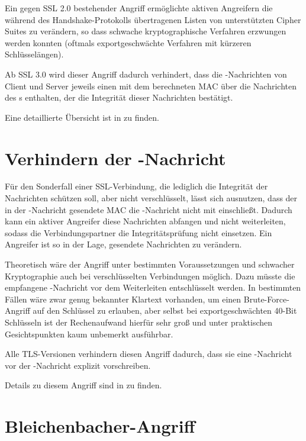 Ein gegen SSL 2.0 bestehender Angriff ermöglichte aktiven Angreifern die während des Handshake-Protokolls übertragenen Listen von unterstützten Cipher Suites zu verändern, so dass schwache kryptographische Verfahren erzwungen werden konnten (oftmals exportgeschwächte Verfahren mit kürzeren Schlüsselängen).

Ab SSL 3.0 wird dieser Angriff dadurch verhindert, dass die \finished{}-Nachrichten von Client und Server jeweils einen mit dem \mastersecret{} berechneten MAC über die Nachrichten des \handshakeprotocol{}s enthalten, der die Integrität dieser Nachrichten bestätigt.

Eine detaillierte Übersicht ist in \cite{wagner96} zu finden.

\section{Verhindern der \changecipherspec{}-Nachricht}

Für den Sonderfall einer SSL-Verbindung, die lediglich die Integrität der Nachrichten schützen soll, aber nicht verschlüsselt, lässt sich ausnutzen, dass der in der \finished{}-Nachricht gesendete MAC die \changecipherspec{}-Nachricht nicht mit einschließt. Dadurch kann ein aktiver Angreifer diese Nachrichten abfangen und nicht weiterleiten, sodass die Verbindungspartner die Integritätsprüfung nicht einsetzen. Ein Angreifer ist so in der Lage, gesendete Nachrichten zu verändern. 

Theoretisch wäre der Angriff unter bestimmten Voraussetzungen und schwacher Kryptographie auch bei verschlüsselten Verbindungen möglich. Dazu müsste die empfangene \finished{}-Nachricht vor dem Weiterleiten entschlüsselt werden. In bestimmten Fällen wäre zwar genug bekannter Klartext vorhanden, um einen Brute-Force-Angriff auf den Schlüssel zu erlauben, aber selbst bei exportgeschwächten 40-Bit Schlüsseln ist der Rechenaufwand hierfür sehr groß und unter praktischen Gesichtspunkten kaum unbemerkt ausführbar.

Alle TLS-Versionen verhindern diesen Angriff dadurch, dass sie eine \changecipherspec{}-Nachricht vor der \finished{}-Nachricht explizit vorschreiben.

Details zu diesem Angriff sind in \cite{wagner96} zu finden.

\section{Bleichenbacher-Angriff}
\label{sec_attack_bleichenbacher}

